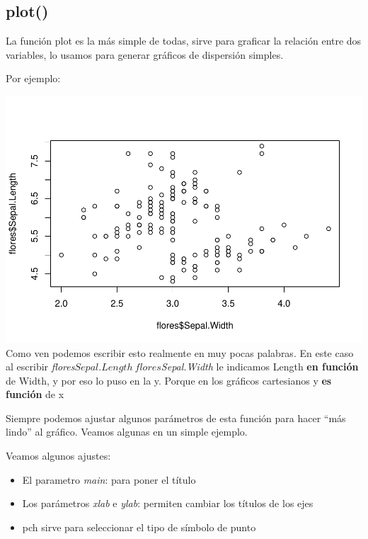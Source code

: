 \documentclass[
]{book}
\newenvironment{Shaded}{\begin{snugshade}}{\end{snugshade}}
\newcommand{\FunctionTok}[1]{\textcolor[rgb]{0.00,0.00,0.00}{#1}}
\newcommand{\NormalTok}[1]{#1}
\newcommand{\SpecialCharTok}[1]{\textcolor[rgb]{0.00,0.00,0.00}{#1}}
\begin{document}
\hypertarget{plot}{%
\subsection{plot()}\label{plot}}

La función plot es la más simple de todas, sirve para graficar la relación entre dos variables, lo usamos para generar gráficos de dispersión simples.

Por ejemplo:

\begin{Shaded}
\end{Shaded}

\includegraphics{Esatadistica_en_R_files/figure-latex/unnamed-chunk-136-1.pdf}
Como ven podemos escribir esto realmente en muy pocas palabras. En este caso al escribir \emph{flores\(Sepal.Length ~ flores\)Sepal.Width} le indicamos Length \textbf{en función} de Width, y por eso lo puso en la y. Porque en los gráficos cartesianos y \textbf{es función} de x

Siempre podemos ajustar algunos parámetros de esta función para hacer ``más lindo'' al gráfico. Veamos algunas en un simple ejemplo.

Veamos algunos ajustes:

\begin{itemize}
\item
  El parametro \emph{main}: para poner el título
\item
  Los parámetros \emph{xlab} e \emph{ylab}: permiten cambiar los títulos de los ejes
\item
  pch sirve para seleccionar el tipo de símbolo de punto
\end{itemize}
\end{document}
